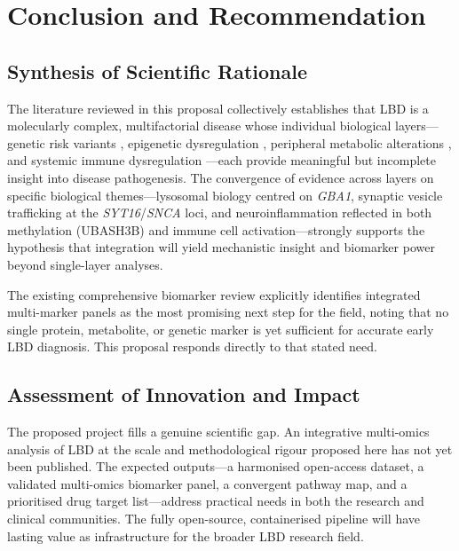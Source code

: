 \section{Conclusion and Recommendation}
\label{sec:conclusion}

\subsection{Synthesis of Scientific Rationale}

The literature reviewed in this proposal collectively establishes that LBD is a molecularly complex, multifactorial disease whose individual biological layers---genetic risk variants \cite{chia2025gwas}, epigenetic dysregulation \cite{nabais2024methylation}, peripheral metabolic alterations \cite{frontiers2024metabolomics}, and systemic immune dysregulation \cite{singlecell2024immune}---each provide meaningful but incomplete insight into disease pathogenesis. The convergence of evidence across layers on specific biological themes---lysosomal biology centred on \textit{GBA1}, synaptic vesicle trafficking at the \textit{SYT16}/\textit{SNCA} loci, and neuroinflammation reflected in both methylation (UBASH3B) and immune cell activation---strongly supports the hypothesis that integration will yield mechanistic insight and biomarker power beyond single-layer analyses.

The existing comprehensive biomarker review \cite{boiten2025biomarkers} explicitly identifies integrated multi-marker panels as the most promising next step for the field, noting that no single protein, metabolite, or genetic marker is yet sufficient for accurate early LBD diagnosis. This proposal responds directly to that stated need.

\subsection{Assessment of Innovation and Impact}

The proposed project fills a genuine scientific gap. An integrative multi-omics analysis of LBD at the scale and methodological rigour proposed here has not yet been published. The expected outputs---a harmonised open-access dataset, a validated multi-omics biomarker panel, a convergent pathway map, and a prioritised drug target list---address practical needs in both the research and clinical communities. The fully open-source, containerised pipeline will have lasting value as infrastructure for the broader LBD research field.

